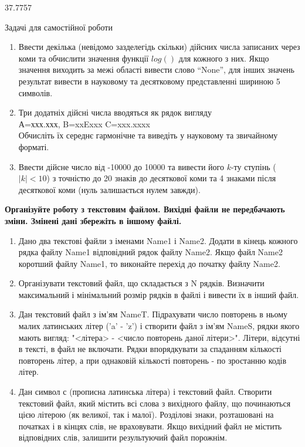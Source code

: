 \documentclass[]{article}
\makeatletter
\newcommand{\xslalph}[1]{\expandafter\@xslalph\csname c@#1\endcsname}
\newcommand{\@xslalph}[1]{%
    \ifcase#1\or а\or б\or в\or г\or д\or e\or є\or ж\or з\or i%
    \or й\or к\or л\or м\or н\or о\or п\or р\or с\or т%
    \or у\or ф\or х\or ц\or ч\or ш\or ю\or я\or аа\or бб\or вв%
    \else\@ctrerr\fi%
}
\makeatother
\begin{document}
\begin{enumerate}
\begin{enumerate}[label=\xslalph*)]
\begin{enumerate}
\begin{enumerate}[label=\xslalph*)]
\begin{enumerate}
37.7757

\end{enumerate}

Задачі для самостійної роботи

\begin{enumerate}
\def\labelenumi{\arabic{enumi})}
\setcounter{enumi}{5}
\item
  Ввести декілька (невідомо зазделегідь скільки) дійсних числа записаних
  через коми та обчислити значення функції $log()$ для кожного з них. Якщо
  значення виходить за межі області вивести слово ``None'', для інших
  значень результат вивести в науковому та десятковому представленні
  шириною 5 символів.
\item
  Три додатніх дійсні числа вводяться як рядок вигляду \\
  А=ххх.ххх, B=xxExxx C=xxx.xxxx\\
  Обчисліть їх середнє гармонічне та виведіть у науковому та звичайному
  форматі.
\item
  Ввести дійсне число від -10000 до 10000 та вивести його $k$-ту ступінь
  ($|k|<10$) з точністю до 20 знаків до десяткової коми та 4
  знаками після десяткової коми (нуль залишається нулем завжди).
\end{enumerate}

\textbf{Організуйте роботу з текстовим файлом. Вихідні файли не передбачають
  зміни. Змінені дані збережіть в іншому файлі.}

\begin{enumerate}
\def\labelenumi{\arabic{enumi})}
\setcounter{enumi}{8}
\item
  Дано два текстові файли з іменами Name1 і Name2. Додати в кінець
  кожного рядка файлу Name1 відповідний рядок файлу Name2. Якщо файл
  Name2 коротший файлу Name1, то виконайте перехід до початку файлу
  Name2.
\item
  Організувати текстовий файл, що складається з N рядків. Визначити
  максимальний і мінімальний розмір рядків в файлі і вивести їх в інший
  файл.
\item
  Дан текстовий файл з ім'ям NameT. Підрахувати число повторень в ньому
  малих латинських літер ('a' - 'z') і створити файл з ім'ям NameS,
  рядки якого мають вигляд: "\textless{}літера\textgreater{} -
  \textless{}число повторень даної літери\textgreater{}". Літери,
  відсутні в тексті, в файл не включати. Рядки впорядкувати за спаданням
  кількості повторень літер, а при однаковій кількості повторень - по
  зростанню кодів літер.
\item
  Дан символ с (прописна латинська літера) і текстовий файл. Створити
  текстовий файл, який містить всі слова з вихідного файлу, що
  починаються цією літерою (як великої, так і малої). Розділові знаки,
  розташовані на початках і в кінцях слів, не враховувати. Якщо вихідний
  файл не містить відповідних слів, залишити результуючий файл порожнім.
\end{enumerate}


\end{enumerate}
\end{enumerate}
\end{enumerate}
\end{enumerate}
\end{document}

